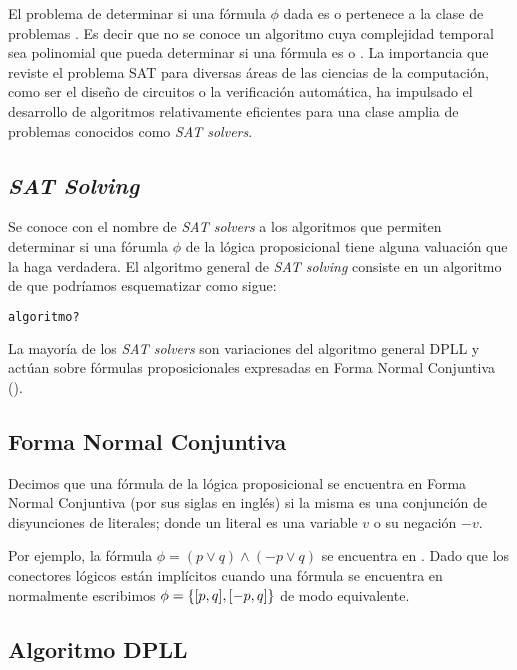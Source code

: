 \documentclass[a4paper, 11pt, twoside]{tesis}
\begin{document}
El problema de determinar si una fórmula $\phi$ dada es \sat o \unsat pertenece
a la clase de problemas \npc\cite{Cook:1971:CTP:800157.805047}. Es decir que no
se conoce un algoritmo cuya complejidad temporal sea polinomial que pueda determinar si una fórmula es \sat
o \unsat. La importancia que reviste el problema SAT para diversas áreas de las
ciencias de la computación, como ser el diseño de circuitos o la verificación
automática, ha impulsado el desarrollo de algoritmos relativamente eficientes
para una clase amplia de problemas conocidos como \emph{SAT solvers}.

\subsection{\emph{SAT Solving}}

Se conoce con el nombre de \emph{SAT solvers} a los algoritmos que permiten
determinar si una fórumla $\phi$ de la lógica proposicional tiene alguna
valuación que la haga verdadera. El algoritmo general de  \emph{SAT solving}
consiste en un algoritmo de \bt que podríamos esquematizar como sigue:

\begin{lstlisting}[mathescape,language=python]
algoritmo?
\end{lstlisting}

La mayoría de los \emph{SAT solvers} son
variaciones del algoritmo general
DPLL\cite{Davis:1962:MPT:368273.368557} y actúan sobre fórmulas
proposicionales expresadas en Forma Normal Conjuntiva (\cnf).

\subsection{Forma Normal Conjuntiva}

Decimos que una fórmula de la lógica proposicional se encuentra en Forma Normal
Conjuntiva (\cnf por sus siglas en inglés) si la misma es una conjunción de
disyunciones de literales; donde un literal es una variable $v$ o su negación
$-v$.

Por ejemplo, la fórmula $\phi = (p \vee q) \wedge (-p \vee q)$ se encuentra
en \cnf. Dado que los conectores lógicos están implícitos cuando una fórmula se
encuentra en \cnf normalmente escribimos $\phi = \{[p, q], [-p,
q]\}$ de modo equivalente.

\subsection{Algoritmo DPLL}
\end{document}

